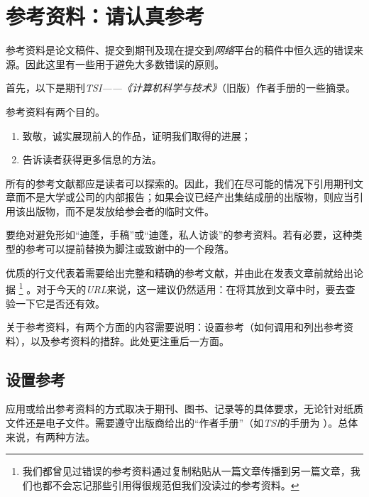 \chapter{参考资料：请认真参考}\label{chap6}

参考资料是论文稿件、提交到期刊及现在提交到\emph{网络}平台的稿件中恒久远的错误来源。因此这里有一些用于避免大多数错误的原则。

首先，以下是期刊\emph{TSI——《计算机科学与技术》}（旧版）作者手册的一些摘录。

\begin{mdframed}
    参考资料有两个目的。

    \begin{enumerate}
        \item 致敬，诚实展现前人的作品，证明我们取得的进展；
        \item 告诉读者获得更多信息的方法。
    \end{enumerate}

    所有的参考文献都应是读者可以探索的。因此，我们在尽可能的情况下引用期刊文章而不是大学或公司的内部报告；如果会议已经产出集结成册的出版物，则应当引用该出版物，而不是发放给参会者的临时文件。

    要绝对避免形如``迪蓬，手稿''或``迪蓬，私人访谈''的参考资料。若有必要，这种类型的参考可以提前替换为脚注或致谢中的一个段落。
\end{mdframed}

优质的行文代表着需要给出完整和精确的参考文献，并由此在发表文章前就给出论据
    \footnote{我们都曾见过错误的参考资料通过复制粘贴从一篇文章传播到另一篇文章，我们也都不会忘记那些引用得很规范但我们没读过的参考资料。}
。对于今天的\emph{URL}来说，这一建议仍然适用：在将其放到文章中时，要去查验一下它是否还有效。

关于参考资料，有两个方面的内容需要说明：设置参考（如何调用和列出参考资料），以及参考资料的措辞。此处更注重后一方面。

\section{设置参考}

应用或给出参考资料的方式取决于期刊、图书、记录等的具体要求，无论针对纸质文件还是电子文件。需要遵守出版商给出的``作者手册''（如\emph{TSI}的手册为  ）。总体来说，有两种方法。

